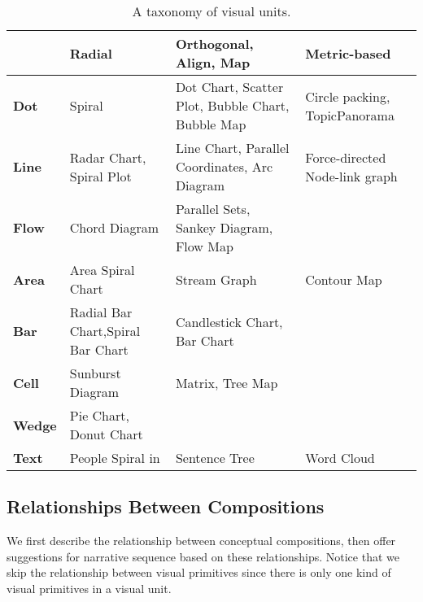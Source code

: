 \begin{table}[tb]
  \caption{A taxonomy of visual units.}
  \label{tab:unit}
  \small
  \centering
  \begin{tabular}{p{0.8cm}|p{2.0cm}|p{2.0cm}|p{2.0cm}}
  \toprule
 \textbf{} &\textbf{Radial} &\textbf{Orthogonal, Align, Map} &\textbf{Metric-based}   \\ 
  \midrule
  \textbf{Dot} &Spiral&Dot Chart, Scatter Plot, Bubble Chart, Bubble Map &Circle packing, TopicPanorama\cite{7042494}\\
  \midrule
  \textbf{Line}&  Radar Chart, Spiral Plot    &Line Chart, Parallel Coordinates, Arc Diagram &  Force-directed Node-link graph   \\ 
  \midrule
   \textbf{Flow}&  Chord Diagram   &Parallel Sets, Sankey Diagram, 
   Flow Map  & \\
  \midrule
  \textbf{Area}&  Area Spiral Chart &Stream Graph & Contour Map \\ 
  \midrule
  \textbf{Bar}&      Radial Bar Chart,Spiral Bar Chart  & Candlestick Chart, Bar Chart  &   \\
  \midrule
  \textbf{Cell}& Sunburst Diagram  &Matrix, Tree Map &  \\
  \midrule
  \textbf{Wedge}& Pie Chart, Donut Chart &  &  \\
  \midrule
  \textbf{Text}&  People Spiral in\cite{dork_visual_2010}  &  Sentence Tree  & Word Cloud \\
  \bottomrule
  
  \end{tabular}
  \vspace{1mm}
\end{table}

\subsection{Relationships Between Compositions}
\label{relationship}
We first describe the relationship between conceptual compositions, then offer suggestions for narrative sequence based on these relationships. Notice that we skip the relationship between visual primitives since there is only one kind of visual primitives in a visual unit. 



